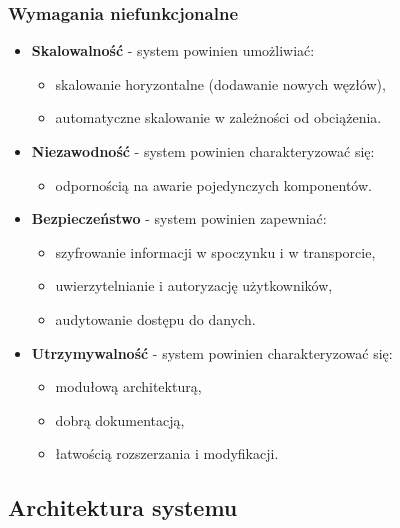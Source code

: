 \newpage

\subsubsection{Wymagania niefunkcjonalne}
\label{subsubsec:wymagania_niefunkcjonalne}

\begin{itemize}
    
    \item \textbf{Skalowalność} - system powinien umożliwiać:
    \begin{itemize}
        \item skalowanie horyzontalne (dodawanie nowych węzłów),
        \item automatyczne skalowanie w zależności od obciążenia.
    \end{itemize}
    
    \item \textbf{Niezawodność} - system powinien charakteryzować się:
    \begin{itemize}
        \item odpornością na awarie pojedynczych komponentów.
    \end{itemize}
    
    \item \textbf{Bezpieczeństwo} - system powinien zapewniać:
    \begin{itemize}
        \item szyfrowanie informacji w spoczynku i w transporcie,
        \item uwierzytelnianie i autoryzację użytkowników,
        \item audytowanie dostępu do danych.
    \end{itemize}
    
    \item \textbf{Utrzymywalność} - system powinien charakteryzować się:
    \begin{itemize}
        \item modułową architekturą,
        \item dobrą dokumentacją,
        \item łatwością rozszerzania i modyfikacji.
    \end{itemize}
\end{itemize}

\newpage

\subsection{Architektura systemu}
\label{subsec:architektura}


